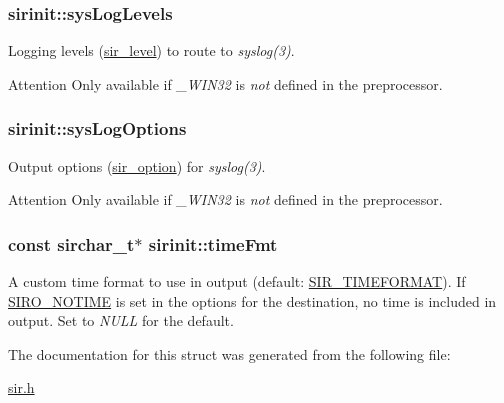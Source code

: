 \subsubsection[{\texorpdfstring{sys\+Log\+Levels}{sysLogLevels}}]{ sirinit\+::sys\+Log\+Levels}\hypertarget{structsirinit_ab3499f342b50831ba3a39410dba38866}{}\label{structsirinit_ab3499f342b50831ba3a39410dba38866}
Logging levels (\hyperlink{sir_8h_a4a3303c67acd49bea38fd3565d458cb2}{sir\+\_\+level}) to route to {\itshape syslog(3)}.

\begin{DoxyAttention}{Attention}
Only available if {\itshape \+\_\+\+W\+I\+N32} is {\itshape not} defined in the preprocessor. 
\end{DoxyAttention}
\subsubsection[{\texorpdfstring{sys\+Log\+Options}{sysLogOptions}}]{ sirinit\+::sys\+Log\+Options}\hypertarget{structsirinit_ab3340fe95410595d83b6d8337b7037a9}{}\label{structsirinit_ab3340fe95410595d83b6d8337b7037a9}
Output options (\hyperlink{sir_8h_a9ed1c599dfd76231f4e0dadf46bff40b}{sir\+\_\+option}) for {\itshape syslog(3)}.

\begin{DoxyAttention}{Attention}
Only available if {\itshape \+\_\+\+W\+I\+N32} is {\itshape not} defined in the preprocessor. 
\end{DoxyAttention}
\subsubsection[{\texorpdfstring{time\+Fmt}{timeFmt}}]{\setlength{\rightskip}{0pt plus 5cm}const {\bf sirchar\+\_\+t}$\ast$ sirinit\+::time\+Fmt}\hypertarget{structsirinit_a5f1cfe947c23692684183b871395de28}{}\label{structsirinit_a5f1cfe947c23692684183b871395de28}
A custom time format to use in output (default\+: \hyperlink{sir_8h_ab1531d6b0d9c880b793362322542794c}{S\+I\+R\+\_\+\+T\+I\+M\+E\+F\+O\+R\+M\+AT}). If \hyperlink{sir_8h_a9ed1c599dfd76231f4e0dadf46bff40baeafb73ebdeb2df401d9fdfc39734fc8d}{S\+I\+R\+O\+\_\+\+N\+O\+T\+I\+ME} is set in the options for the destination, no time is included in output. Set to {\itshape N\+U\+LL} for the default. 

The documentation for this struct was generated from the following file\+:\begin{DoxyCompactItemize}
\item 
\hyperlink{sir_8h}{sir.\+h}\end{DoxyCompactItemize}
